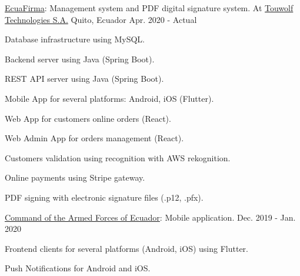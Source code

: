 
\begin{cventries}

  \cventry
    {\href{https://ecuafirma.com}{EcuaFirma}: Management system and PDF digital signature system.} %
    {At \href{https://touwolf.com/}{Touwolf Technologies S.A.}} %
    {Quito, Ecuador} %
    {Apr. 2020 - Actual} %
    {
      \begin{cvitems} %
        \item {Database infrastructure using MySQL.}
        \item {Backend server using Java (Spring Boot).}
        \item {REST API server using Java (Spring Boot).}
        \item {Mobile App for several platforms: Android, iOS (Flutter).}
        \item {Web App for customers online orders (React).}
        \item {Web Admin App for orders management (React).}
        \item {Customers validation using recognition with AWS rekognition.}
        \item {Online payments using Stripe gateway.}
        \item {PDF signing with electronic signature files (.p12, .pfx).}
      \end{cvitems}
    }

  \cventry
    {\href{https://www.ccffaa.mil.ec/}{Command of the Armed Forces of Ecuador}: Mobile application.} %
    {} %
    {} %
    {Dec. 2019 - Jan. 2020} %
    {
      \begin{cvitems} %
        \item {Frontend clients for several platforms (Android, iOS) using Flutter.}
        \item {Push Notifications for Android and iOS.}
      \end{cvitems}
    }


\end{cventries}
